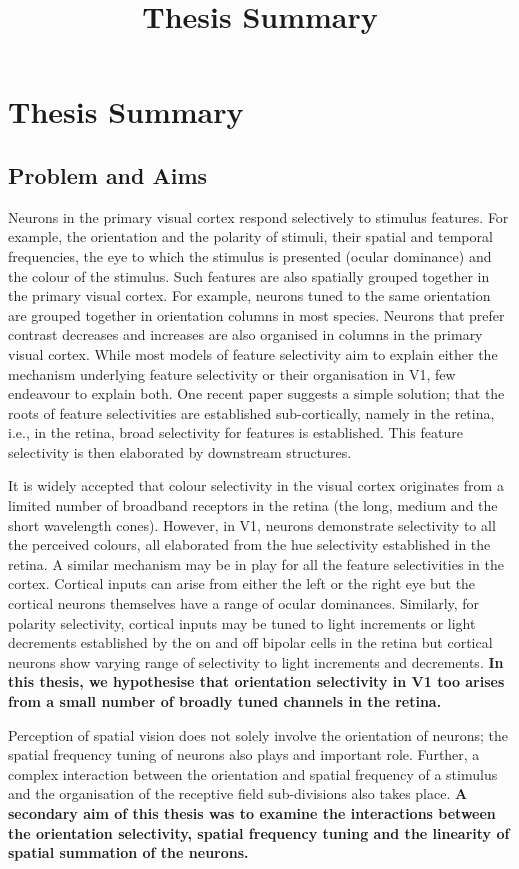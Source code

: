 \documentclass [12] {report}
\title{Thesis Summary}
\begin{document}
	
	\tableofcontents
	\chapter{Thesis Summary}
	\section{Problem and Aims}
    Neurons in the primary visual cortex respond selectively to stimulus features. For example, the orientation and the polarity of stimuli, their spatial and temporal frequencies, the eye to which the stimulus is presented (ocular dominance) and the colour of the stimulus. Such features are also spatially grouped together in the primary visual cortex. For example, neurons tuned to the same orientation are grouped together in orientation columns in most species. Neurons that prefer contrast decreases and increases are also organised in columns in the primary visual cortex. While most models of feature selectivity aim to explain either the mechanism underlying feature selectivity or their organisation in V1, few endeavour to explain both. One recent paper suggests a simple solution; that the roots of feature selectivities are established sub-cortically, namely in the retina, i.e., in the retina, broad selectivity for features is established. This feature selectivity is then elaborated by downstream structures.
    
    It is widely accepted that colour selectivity in the visual cortex originates from a limited number of broadband receptors in the retina (the long, medium and the short wavelength cones). However, in V1, neurons demonstrate selectivity to all the perceived colours, all elaborated from the hue selectivity established in the  retina. A similar mechanism may be in play for all the feature selectivities in the cortex. Cortical inputs can arise from either the left or the right eye but the cortical neurons themselves have a range of ocular dominances. Similarly, for polarity selectivity, cortical inputs may be tuned to light increments or light decrements established by the on and off bipolar cells in the retina but cortical neurons show varying range of selectivity to light increments and decrements. \textbf{In this thesis, we hypothesise that orientation selectivity in V1 too arises from a small number of broadly tuned channels in the retina.}
    
	Perception of spatial vision does not solely involve the orientation of neurons; the spatial frequency tuning of neurons also plays and important role. Further, a complex interaction between the orientation and spatial frequency of a stimulus and the organisation of the receptive field sub-divisions also takes place. \textbf{A secondary aim of this thesis was to examine the interactions between the orientation selectivity, spatial frequency tuning and the linearity of spatial summation of the neurons.}
    
\end{document}
